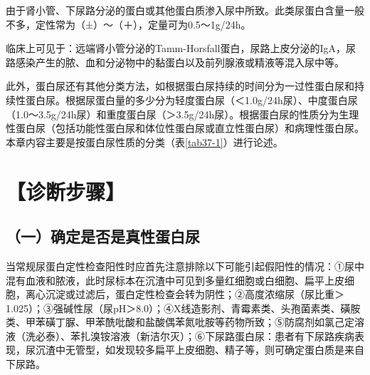 由于肾小管、下尿路分泌的蛋白或其他蛋白质渗入尿中所致。此类尿蛋白含量一般不多，定性常为（±）～（＋），定量可为0.5～1g/24h。

临床上可见于：远端肾小管分泌的Tamm-Horsfall蛋白，尿路上皮分泌的IgA，尿路感染产生的脓、血和分泌物中的黏蛋白以及前列腺液或精液等混入尿中等。

此外，蛋白尿还有其他分类方法，如根据蛋白尿持续的时间分为一过性蛋白尿和持续性蛋白尿。根据尿蛋白量的多少分为轻度蛋白尿（＜1.0g/24h尿）、中度蛋白尿（1.0～3.5g/24h尿）和重度蛋白尿（＞3.5g/24h尿）。根据蛋白尿的性质分为生理性蛋白尿（包括功能性蛋白尿和体位性蛋白尿或直立性蛋白尿）和病理性蛋白尿。本章内容主要是按蛋白尿性质的分类（表\ref{tab37-1}）进行论述。

\section{【诊断步骤】}

\subsection{（一）确定是否是真性蛋白尿}

当常规尿蛋白定性检查阳性时应首先注意排除以下可能引起假阳性的情况：①尿中混有血液和脓液，此时尿标本在沉渣中可见到多量红细胞或白细胞、扁平上皮细胞，离心沉淀或过滤后，蛋白定性检查会转为阴性；②高度浓缩尿（尿比重＞1.025）；③强碱性尿（尿pH＞8.0）；④X线造影剂、青霉素类、头孢菌素类、磺胺类、甲苯磺丁脲、甲苯酰吡酸和盐酸偶苯氮吡胺等药物所致；⑤防腐剂如氯己定溶液（洗必泰）、苯扎溴铵溶液（新洁尔灭）；⑥下尿路蛋白尿：患者有下尿路疾病表现，尿沉渣中无管型，如发现较多扁平上皮细胞、精子等，则可确定蛋白质是来自下尿路。

